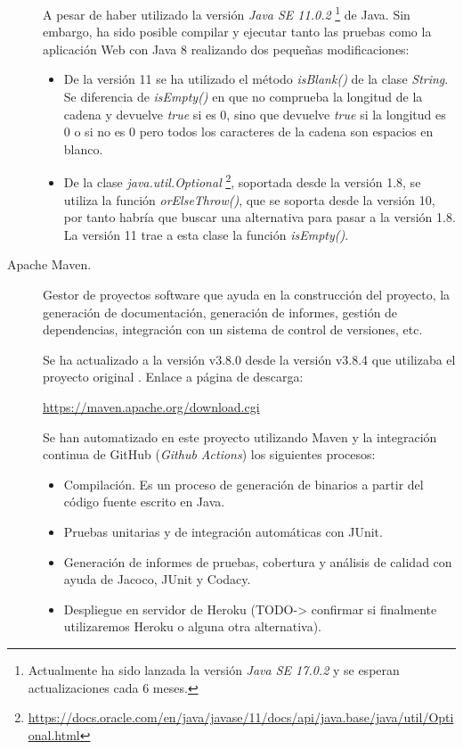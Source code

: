 \begin{description}
		A pesar de haber utilizado la versión \textit{Java SE 11.0.2} \footnote{Actualmente ha sido lanzada la versión \textit{Java SE 17.0.2} y se esperan actualizaciones cada 6 meses.} de Java. Sin embargo, ha sido posible compilar y ejecutar tanto las pruebas como la aplicación Web con Java 8 realizando dos pequeñas modificaciones:
		\begin{itemize}
			\item De la versión 11 se ha utilizado el método \textit{isBlank()} de la clase \textit{String}. Se diferencia de \textit{isEmpty()} en que no comprueba la longitud de la cadena y devuelve \textit{true} si es 0, sino que devuelve \textit{true} si la longitud es 0 o si no es 0 pero todos los caracteres de la cadena son espacios en blanco.
			\item De la clase \textit{java.util.Optional} \footnote{\url{https://docs.oracle.com/en/java/javase/11/docs/api/java.base/java/util/Optional.html}}, soportada desde la versión 1.8, se utiliza la función \textit{orElseThrow()}, que se soporta desde la versión 10, por tanto habría que buscar una alternativa para pasar a la versión 1.8. La versión 11 trae a esta clase la función \textit{isEmpty()}.
		\end{itemize}
	\item[Apache Maven.] Gestor de proyectos software que ayuda en la construcción del proyecto, la generación de documentación, generación de informes, gestión de dependencias, integración con un sistema de control de versiones, etc. 
	
		Se ha actualizado a la versión v3.8.0 desde la versión  v3.8.4 que utilizaba el proyecto original \cite{TFGPrevio}. Enlace a página de descarga:
		
		\url{https://maven.apache.org/download.cgi}
		
		Se han automatizado en este proyecto utilizando Maven y la integración continua de GitHub (\textit{Github Actions}) los siguientes procesos:
		\begin{itemize}
			\item Compilación. Es un proceso de generación de binarios a partir del código fuente escrito en Java.
			\item Pruebas unitarias y de integración automáticas con JUnit.
			\item Generación de informes de pruebas, cobertura y análisis de calidad con ayuda de Jacoco, JUnit y Codacy.
			\item Despliegue en servidor de Heroku (TODO-> confirmar si finalmente utilizaremos Heroku o alguna otra alternativa).
		\end{itemize}
	

\end{description}
